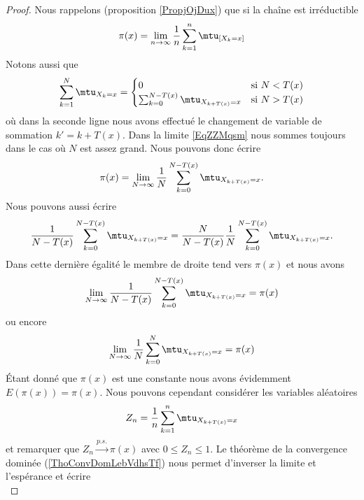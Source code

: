\begin{proof}
    Nous rappelons (proposition \ref{PropjOjDux}) que si la chaîne est irréductible
    \begin{equation}        \label{EqZZMqsm}
        \pi(x)=\lim_{n\to \infty} \frac{1}{ n }\sum_{k=1}^n\mtu_{[X_k=x]}       
    \end{equation}
    Notons aussi que
    \begin{equation}
        \sum_{k=1}^N\mtu_{X_k=x}=\begin{cases}
            0    &   \text{si } N<T(x)\\
            \sum_{k=0}^{N-T(x)}\mtu_{X_{k+T(x)}=x}    &    \text{si } N>T(x)
        \end{cases}
    \end{equation}
    où dans la seconde ligne nous avons effectué le changement de variable de sommation \( k'=k+T(x)\). Dans la limite \eqref{EqZZMqsm} nous sommes toujours dans le cas où \( N\) est assez grand. Nous pouvons donc écrire
    \begin{equation}
        \pi(x)=\lim_{N\to \infty} \frac{1}{ N }\sum_{k=0}^{N-T(x)}\mtu_{X_{k+T(x)}=x}.
    \end{equation}
    Nous pouvons aussi écrire
    \begin{equation}
        \frac{1}{ N-T(x) } \sum_{k=0}^{N-T(x)}\mtu_{X_{k+T(x)}=x}=\frac{ N }{ N-T(x) }\frac{1}{ N } \sum_{k=0}^{N-T(x)}\mtu_{X_{k+T(x)}=x}.
    \end{equation}
    Dans cette dernière égalité le membre de droite tend vers \( \pi(x)\) et nous avons
    \begin{equation}
        \lim_{N\to \infty} \frac{1}{ N-T(x) } \sum_{k=0}^{N-T(x)}\mtu_{X_{k+T(x)}=x}=\pi(x)
    \end{equation}
    ou encore
    \begin{equation}
        \lim_{N\to \infty} \frac{1}{ N} \sum_{k=0}^{N}\mtu_{X_{k+T(x)}=x}=\pi(x)
    \end{equation}
    Étant donné que $\pi(x)$ est une constante nous avons évidemment $E(\pi(x))=\pi(x)$. Nous pouvons cependant considérer les variables aléatoires
    \begin{equation}
        Z_n=\frac{1}{ n }\sum_{k=1}^n\mtu_{X_{k+T(x)}=x}
    \end{equation}
    et remarquer que $Z_n\stackrel{p.s.}{\longrightarrow} \pi(x)$ avec $0\leq Z_n\leq 1$. Le théorème de la convergence dominée (\ref{ThoConvDomLebVdhsTf}) nous permet d'inverser la limite et l'espérance et écrire
    \begin{subequations}

\end{subequations}
\end{proof}

